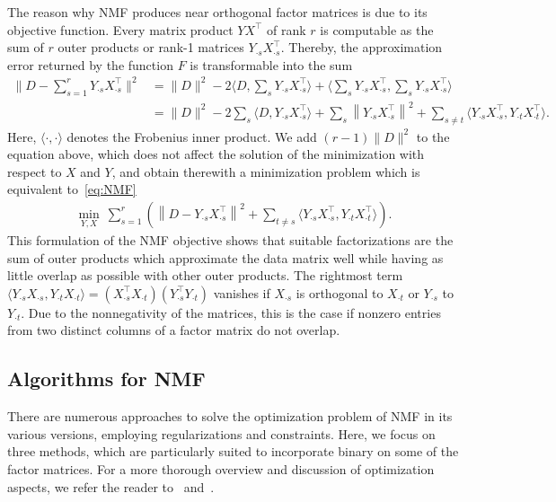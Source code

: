 The reason why NMF produces near orthogonal factor matrices is due to its objective function. Every matrix product $YX^\top$ of rank $r$ is computable as the sum of $r$ outer products or rank-1 matrices $Y_{\cdot s}X_{\cdot s}^\top$. Thereby, the approximation error returned by the function $F$ is transformable into the sum
\begin{align*}
\Big\|D-\sum_{s=1}^rY_{\cdot s}X_{\cdot s}^\top\Big\|^2 &= \|D\|^2 -2\Big\langle D,\sum_sY_{\cdot s}X_{\cdot s}^\top\Big\rangle + \Big\langle \sum_sY_{\cdot s}X_{\cdot s}^\top,\sum_sY_{\cdot s}X_{\cdot s}^\top\Big\rangle\\
&= \|D\|^2 -2\sum_s\Big\langle D,Y_{\cdot s}X_{\cdot s}^\top\Big\rangle +\sum_s \left\|Y_{\cdot s}X_{\cdot s}^\top\right\|^2 + \sum_{s\neq t}\Big\langle Y_{\cdot s}X_{\cdot s}^\top,Y_{\cdot t}X_{\cdot t}^\top\Big\rangle.
\end{align*}
Here, $\langle\cdot,\cdot\rangle$ denotes the Frobenius inner product. We add $(r-1)\|D\|^2$ to the equation above, which does not affect the solution of the minimization with respect to $X$ and $Y$, and obtain therewith a minimization problem which is equivalent to~\eqref{eq:NMF} 
\begin{align}
\min_{Y,X}\ \sum_{s=1}^r \left( \left\|D-Y_{\cdot s}X_{\cdot s}^\top\right\|^2 + \sum_{t\neq s}\Big\langle Y_{\cdot s}X_{\cdot s}^\top,Y_{\cdot t}X_{\cdot t}^\top\Big\rangle\right).\label{eq:NMFOrth}
\end{align}
This formulation of the NMF objective shows that suitable factorizations are the sum of outer products which approximate the data matrix well while having as little overlap as possible with other outer products. The rightmost term $\langle Y_{\cdot s}X_{\cdot s},Y_{\cdot t}X_{\cdot t}\rangle = (X_{\cdot s}^\top X_{\cdot t})(Y_{\cdot s}^\top Y_{\cdot t})$ vanishes if $X_{\cdot s}$ is orthogonal to $X_{\cdot t}$ or $Y_{\cdot s}$ to $Y_{\cdot t}$. Due to the nonnegativity of the matrices, this is the case if nonzero entries from two distinct columns of a factor matrix do not overlap. 
\subsection{Algorithms for NMF}\label{sec:ZS:algNMF}
There are numerous approaches to solve the optimization problem of NMF in its various versions, employing regularizations and constraints. Here, we focus on three methods, which are particularly suited to incorporate binary on some of the factor matrices. For a more thorough overview and discussion of optimization aspects, we refer the reader to~\cite{cichocki2009nonnegative} and~\cite{kim2014algorithms}.
%
